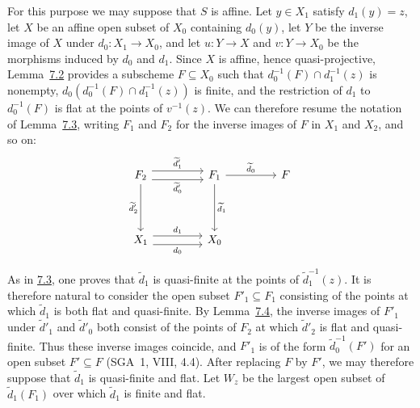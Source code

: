 For this purpose we may suppose that \(S\) is affine. Let \(y\in X_1\)
satisfy \(d_1(y)=z\), let \(X\) be an affine open subset of \(X_0\)
containing \(d_0(y)\), let \(Y\) be the inverse image of \(X\) under
\(d_0:X_1\to X_0\), and let \(u:Y\to X\) and \(v:Y\to X_0\) be the
morphisms induced by \(d_0\) and \(d_1\). Since \(X\) is affine, hence
quasi-projective, Lemma~\hyperref[lem:sga3-V-7.2]{7.2} provides a
subscheme \(F\subseteq X_0\) such that
\(d_0^{-1}(F)\cap d_1^{-1}(z)\) is nonempty,
\(d_0(d_0^{-1}(F)\cap d_1^{-1}(z))\) is finite, and the restriction of
\(d_1\) to \(d_0^{-1}(F)\) is flat at the points of \(v^{-1}(z)\).
We can therefore resume the notation of
Lemma~\hyperref[lem:sga3-V-7.3]{7.3}, writing \(F_1\) and \(F_2\) for
the inverse images of \(F\) in \(X_1\) and \(X_2\), and so on:
\[
\begin{tikzcd}[column sep=4.4em, row sep=4.2em]
F_2
  \arrow[r, shift left=0.9ex, "{\widetilde d'_1}"]
  \arrow[r, shift right=0.9ex, swap, "{\widetilde d'_0}"]
  \arrow[d, swap, "{\widetilde d'_2}"]
&
F_1
  \arrow[r, "{\widetilde d_0}"]
  \arrow[d, "{\widetilde d_1}"]
&
F
\\
X_1
  \arrow[r, shift left=0.9ex, "d_1"]
  \arrow[r, shift right=0.9ex, swap, "d_0"]
&
X_0
&
\end{tikzcd}
\]

As in \hyperref[lem:sga3-V-7.3]{7.3}, one proves that
\(\widetilde d_1\) is quasi-finite at the points of
\(\widetilde d_1^{-1}(z)\). It is therefore natural to consider the
open subset \(F'_1\subseteq F_1\) consisting of the points at which
\(\widetilde d_1\) is both flat and quasi-finite. By
Lemma~\hyperref[lem:sga3-V-7.4]{7.4}, the inverse images of \(F'_1\)
under \(\widetilde d'_1\) and \(\widetilde d'_0\) both consist of the
points of \(F_2\) at which \(\widetilde d'_2\) is flat and
quasi-finite. Thus these inverse images coincide, and \(F'_1\) is of
the form \(\widetilde d_0^{-1}(F')\) for an open subset \(F'\subseteq F\)
(SGA~1, VIII, 4.4). After replacing \(F\) by \(F'\), we may therefore
suppose that \(\widetilde d_1\) is quasi-finite and flat. Let \(W_z\)
be the largest open subset of \(\widetilde d_1(F_1)\) over which
\(\widetilde d_1\) is finite and flat.

